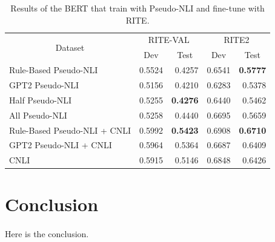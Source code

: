 \documentclass{article}
\begin{document}
\begin{CJK*}{UTF8}{bkai}
\begin{table}
  \centering
  \begin{tabular}{|l|r|r|r|r|}
  \hline
  \multicolumn{1}{|c|}{\multirow{2}{*}{Dataset}} & \multicolumn{2}{c|}{RITE-VAL} & \multicolumn{2}{c|}{RITE2} \\ \cline{2-5}
  \multicolumn{1}{|c|}{} & \multicolumn{1}{c|}{Dev} & \multicolumn{1}{c|}{Test} & \multicolumn{1}{c|}{Dev} & \multicolumn{1}{c|}{Test} \\ \hline
  Rule-Based Pseudo-NLI & 0.5524 & 0.4257 & 0.6541 & \textbf{0.5777} \\ \hline
  GPT2 Pseudo-NLI & 0.5156 & 0.4210 & 0.6283 & 0.5378 \\ \hline
  Half Pseudo-NLI & 0.5255 & \textbf{0.4276} & 0.6440 & 0.5462 \\ \hline
  All Pseudo-NLI & 0.5258 & 0.4440 & 0.6695 & 0.5659 \\ \hline
  Rule-Based Pseudo-NLI + CNLI & 0.5992 & \textbf{0.5423} & 0.6908 & \textbf{0.6710} \\ \hline
  GPT2 Pseudo-NLI + CNLI & 0.5964 & 0.5364 & 0.6687 & 0.6409 \\ \hline
  CNLI & 0.5915 & 0.5146 & 0.6848 & 0.6426 \\ \hline
  \end{tabular}
  \caption{Results of the BERT that train with Pseudo-NLI and fine-tune with RITE.}
  \label{result:pseudo_nli_bert}
\end{table}

\section{Conclusion} \label{section:conclusion}
\paragraph{}
Here is the conclusion.

% 
% 
\printbibliography
\end{CJK*}
\end{document}
